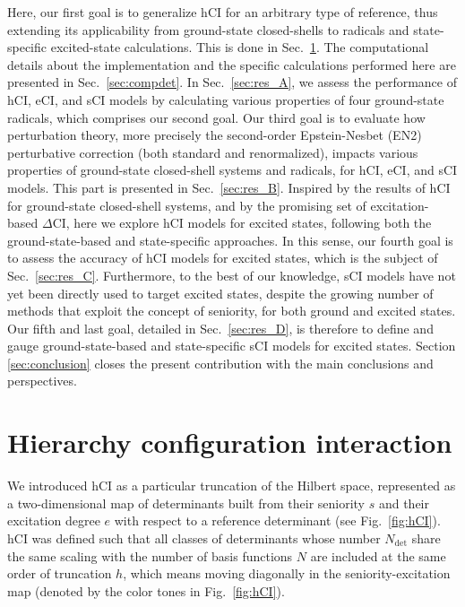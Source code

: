 \documentclass[aip,jcp,reprint,noshowkeys,superscriptaddress]{revtex4-1}
\newcommand{\Ndet}{N_\text{det}}
\begin{document}
Here, our first goal is to generalize hCI for an arbitrary type of reference, thus extending its applicability from ground-state closed-shells \cite{Kossoski_2022}
to radicals and state-specific excited-state calculations.
This is done in Sec.~\ref{sec:hCI}.
The computational details about the implementation and the specific calculations performed here are presented in Sec.~\ref{sec:compdet}.
In Sec.~\ref{sec:res_A}, we assess the performance of hCI, eCI, and sCI models by calculating various properties of four ground-state radicals, which comprises our second goal.
Our third goal is to evaluate how perturbation theory, more precisely the second-order Epstein-Nesbet (EN2) perturbative correction (both standard and renormalized), \cite{Garniron_2019}
impacts various properties of ground-state closed-shell systems and radicals, for hCI, eCI, and sCI models.
This part is presented in Sec.~\ref{sec:res_B}.
Inspired by the results of hCI for ground-state closed-shell systems, \cite{Kossoski_2022}
and by the promising set of excitation-based $\Delta$CI, \cite{Kossoski_2023} here we explore hCI models for excited states, following both the ground-state-based and state-specific approaches.
In this sense, our fourth goal is to assess the accuracy of hCI models for excited states, which is the subject of Sec.~\ref{sec:res_C}.
Furthermore, to the best of our knowledge, sCI models have not yet been directly used to target excited states,
despite the growing number of methods that exploit the concept of seniority,
for both ground
\cite{Limacher_2013,Limacher_2014,Tecmer_2014,Boguslawski_2014a,Boguslawski_2015,Boguslawski_2014b,Boguslawski_2014c,Johnson_2020,Henderson_2014,Stein_2014,Henderson_2015,Chen_2015,Bytautas_2018,Marie_2021,Boguslawski_2021,Tecmer_2022,Mamache_2023}
and excited states.
\cite{Boguslawski_2016b,Boguslawski_2016c,Boguslawski_2019,Nowak_2019,Kossoski_2021,Marie_2021,Tecmer_2022,Rishi_2023,Nowak_2023}
Our fifth and last goal, detailed in Sec.~\ref{sec:res_D}, is therefore to define and gauge ground-state-based and state-specific sCI models for excited states.
Section \ref{sec:conclusion} closes the present contribution with the main conclusions and perspectives.


\section{Hierarchy configuration interaction}
\label{sec:hCI}

We introduced hCI \cite{Kossoski_2022} as a particular truncation of the Hilbert space,
represented as a two-dimensional map of determinants built from their seniority $s$ and their excitation degree $e$ with respect to a reference determinant (see Fig.~\ref{fig:hCI}).
hCI was defined such that all classes of determinants whose number $\Ndet$ share the same scaling with the number of basis functions $N$ are included at the same order of truncation $h$,
which means moving diagonally in the seniority-excitation map (denoted by the color tones in Fig.~\ref{fig:hCI}).
\end{document}
